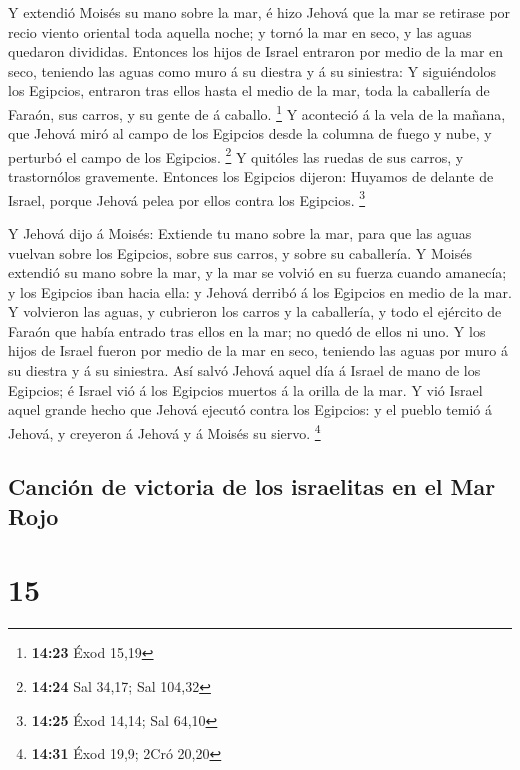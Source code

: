  Y extendió Moisés su mano sobre la mar, é hizo Jehová
que la mar se retirase por recio viento oriental toda aquella noche; y
tornó la mar en seco, y las aguas quedaron divididas. 
Entonces los hijos de Israel entraron por medio de la mar en seco,
teniendo las aguas como muro á su diestra y á su siniestra:
 Y siguiéndolos los Egipcios, entraron tras ellos hasta
el medio de la mar, toda la caballería de Faraón, sus carros, y su gente
de á caballo. \footnote{\textbf{14:23} Éxod 15,19}  Y
aconteció á la vela de la mañana, que Jehová miró al campo de los
Egipcios desde la columna de fuego y nube, y perturbó el campo de los
Egipcios. \footnote{\textbf{14:24} Sal 34,17; Sal 104,32}
 Y quitóles las ruedas de sus carros, y trastornólos
gravemente. Entonces los Egipcios dijeron: Huyamos de delante de Israel,
porque Jehová pelea por ellos contra los Egipcios. \footnote{\textbf{14:25}
  Éxod 14,14; Sal 64,10}

 Y Jehová dijo á Moisés: Extiende tu mano sobre la mar,
para que las aguas vuelvan sobre los Egipcios, sobre sus carros, y sobre
su caballería.  Y Moisés extendió su mano sobre la mar, y
la mar se volvió en su fuerza cuando amanecía; y los Egipcios iban hacia
ella: y Jehová derribó á los Egipcios en medio de la mar.
 Y volvieron las aguas, y cubrieron los carros y la
caballería, y todo el ejército de Faraón que había entrado tras ellos en
la mar; no quedó de ellos ni uno.  Y los hijos de Israel
fueron por medio de la mar en seco, teniendo las aguas por muro á su
diestra y á su siniestra.  Así salvó Jehová aquel día á
Israel de mano de los Egipcios; é Israel vió á los Egipcios muertos á la
orilla de la mar.  Y vió Israel aquel grande hecho que
Jehová ejecutó contra los Egipcios: y el pueblo temió á Jehová, y
creyeron á Jehová y á Moisés su siervo. \footnote{\textbf{14:31} Éxod
  19,9; 2Cró 20,20}

\hypertarget{canciuxf3n-de-victoria-de-los-israelitas-en-el-mar-rojo}{%
\subsection{Canción de victoria de los israelitas en el Mar
Rojo}\label{canciuxf3n-de-victoria-de-los-israelitas-en-el-mar-rojo}}

\hypertarget{section-14}{%
\section{15}\label{section-14}}

